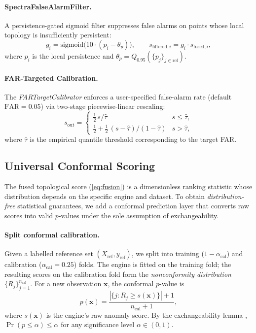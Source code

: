 \documentclass[final]{siamltex}
\begin{document}
\paragraph{SpectraFalseAlarmFilter.}
A persistence-gated sigmoid filter suppresses false alarms on
points whose local topology is insufficiently persistent:
\begin{equation}\label{eq:spectra_gate}
  g_i = \mathrm{sigmoid}\bigl(10\cdot(p_i - \theta_p)\bigr),
  \qquad s_{\mathrm{filtered},i} = g_i\cdot s_{\mathrm{fused},i},
\end{equation}
where $p_i$ is the local persistence and
$\theta_p = Q_{0.95}(\{p_j\}_{j \in \mathrm{ref}})$.

\paragraph{FAR-Targeted Calibration.}
The \emph{FARTargetCalibrator} enforces a user-specified
false-alarm rate (default $\mathrm{FAR} = 0.05$) via
two-stage piecewise-linear rescaling:
\begin{equation}\label{eq:far_cal}
  s_{\mathrm{out}} = \begin{cases}
  \tfrac{1}{2}\,s / \hat{\tau} & s \le \hat{\tau},\\
  \tfrac{1}{2} + \tfrac{1}{2}\,(s - \hat{\tau})/(1 - \hat{\tau})
  & s > \hat{\tau},
  \end{cases}
\end{equation}
where $\hat{\tau}$ is the empirical quantile threshold
corresponding to the target FAR.


\subsection{Universal Conformal Scoring}\label{sec:conformal}

The fused topological score (\ref{eq:fusion}) is a dimensionless
ranking statistic whose distribution depends on the specific
engine and dataset.  To obtain \emph{distribution-free}
statistical guarantees, we add a conformal prediction layer
that converts raw scores into valid $p$-values under the sole
assumption of exchangeability.

\paragraph{Split conformal calibration.}
Given a labelled reference set $(X_{\mathrm{ref}},y_{\mathrm{ref}})$,
we split into training ($1 - \alpha_{\mathrm{cal}}$) and calibration
($\alpha_{\mathrm{cal}} = 0.25$) folds.  The engine is fitted on
the training fold; the resulting scores on the calibration fold
form the \emph{nonconformity distribution}
$\{R_j\}_{j=1}^{n_{\mathrm{cal}}}$.  For a new observation
$\mathbf{x}$, the conformal $p$-value is
\begin{equation}\label{eq:conformal_pval}
  p(\mathbf{x}) = \frac{|\{j : R_j \ge s(\mathbf{x})\}| + 1}
  {n_{\mathrm{cal}} + 1},
\end{equation}
where $s(\mathbf{x})$ is the engine's raw anomaly score.
By the exchangeability lemma \cite{vovk2005algorithmic},
$\Pr(p \le \alpha) \le \alpha$ for any significance level
$\alpha \in (0,1)$.
\end{document}
